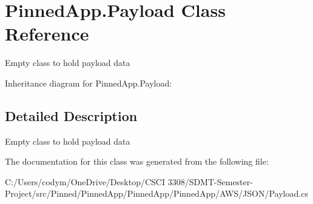 \hypertarget{class_pinned_app_1_1_payload}{}\section{Pinned\+App.\+Payload Class Reference}
\label{class_pinned_app_1_1_payload}


Empty class to hold payload data  




Inheritance diagram for Pinned\+App.\+Payload\+:


\subsection{Detailed Description}
Empty class to hold payload data 



The documentation for this class was generated from the following file\+:\begin{DoxyCompactItemize}
\item 
C\+:/\+Users/codym/\+One\+Drive/\+Desktop/\+C\+S\+C\+I 3308/\+S\+D\+M\+T-\/\+Semester-\/\+Project/src/\+Pinned/\+Pinned\+App/\+Pinned\+App/\+Pinned\+App/\+A\+W\+S/\+J\+S\+O\+N/Payload.\+cs\end{DoxyCompactItemize}
